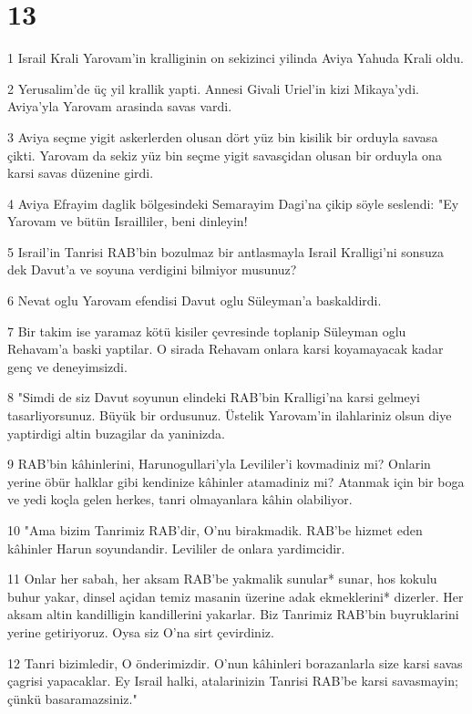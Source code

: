 \chapter{13}

\par 1 Israil Krali Yarovam'in kralliginin on sekizinci yilinda Aviya Yahuda Krali oldu.
\par 2 Yerusalim'de üç yil krallik yapti. Annesi Givali Uriel'in kizi Mikaya'ydi. Aviya'yla Yarovam arasinda savas vardi.
\par 3 Aviya seçme yigit askerlerden olusan dört yüz bin kisilik bir orduyla savasa çikti. Yarovam da sekiz yüz bin seçme yigit savasçidan olusan bir orduyla ona karsi savas düzenine girdi.
\par 4 Aviya Efrayim daglik bölgesindeki Semarayim Dagi'na çikip söyle seslendi: "Ey Yarovam ve bütün Israilliler, beni dinleyin!
\par 5 Israil'in Tanrisi RAB'bin bozulmaz bir antlasmayla Israil Kralligi'ni sonsuza dek Davut'a ve soyuna verdigini bilmiyor musunuz?
\par 6 Nevat oglu Yarovam efendisi Davut oglu Süleyman'a baskaldirdi.
\par 7 Bir takim ise yaramaz kötü kisiler çevresinde toplanip Süleyman oglu Rehavam'a baski yaptilar. O sirada Rehavam onlara karsi koyamayacak kadar genç ve deneyimsizdi.
\par 8 "Simdi de siz Davut soyunun elindeki RAB'bin Kralligi'na karsi gelmeyi tasarliyorsunuz. Büyük bir ordusunuz. Üstelik Yarovam'in ilahlariniz olsun diye yaptirdigi altin buzagilar da yaninizda.
\par 9 RAB'bin kâhinlerini, Harunogullari'yla Levililer'i kovmadiniz mi? Onlarin yerine öbür halklar gibi kendinize kâhinler atamadiniz mi? Atanmak için bir boga ve yedi koçla gelen herkes, tanri olmayanlara kâhin olabiliyor.
\par 10 "Ama bizim Tanrimiz RAB'dir, O'nu birakmadik. RAB'be hizmet eden kâhinler Harun soyundandir. Levililer de onlara yardimcidir.
\par 11 Onlar her sabah, her aksam RAB'be yakmalik sunular* sunar, hos kokulu buhur yakar, dinsel açidan temiz masanin üzerine adak ekmeklerini* dizerler. Her aksam altin kandilligin kandillerini yakarlar. Biz Tanrimiz RAB'bin buyruklarini yerine getiriyoruz. Oysa siz O'na sirt çevirdiniz.
\par 12 Tanri bizimledir, O önderimizdir. O'nun kâhinleri borazanlarla size karsi savas çagrisi yapacaklar. Ey Israil halki, atalarinizin Tanrisi RAB'be karsi savasmayin; çünkü basaramazsiniz."
